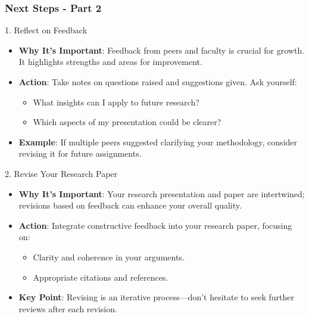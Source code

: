 \documentclass[aspectratio=169]{beamer}
\begin{document}
\begin{frame}[fragile]
    \frametitle{Next Steps - Part 2}
    
    \begin{block}{1. Reflect on Feedback}
        \begin{itemize}
            \item \textbf{Why It's Important}: Feedback from peers and faculty is crucial for growth. It highlights strengths and areas for improvement.
            \item \textbf{Action}: Take notes on questions raised and suggestions given. Ask yourself:
                \begin{itemize}
                    \item What insights can I apply to future research?
                    \item Which aspects of my presentation could be clearer?
                \end{itemize}
            \item \textbf{Example}: If multiple peers suggested clarifying your methodology, consider revising it for future assignments.
        \end{itemize}
    \end{block}
    
    \begin{block}{2. Revise Your Research Paper}
        \begin{itemize}
            \item \textbf{Why It's Important}: Your research presentation and paper are intertwined; revisions based on feedback can enhance your overall quality.
            \item \textbf{Action}: Integrate constructive feedback into your research paper, focusing on:
                \begin{itemize}
                    \item Clarity and coherence in your arguments.
                    \item Appropriate citations and references.
                \end{itemize}
            \item \textbf{Key Point}: Revising is an iterative process—don’t hesitate to seek further reviews after each revision.
        \end{itemize}
    \end{block}
\end{frame}
\end{document}
